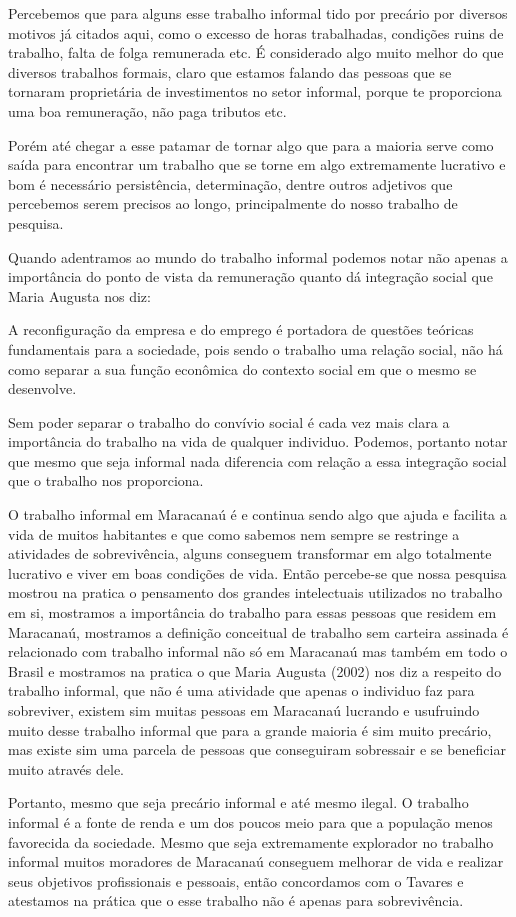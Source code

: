 Percebemos que para alguns esse trabalho informal tido por precário por diversos 
motivos já citados aqui, como o excesso de horas trabalhadas, condições ruins de 
trabalho, falta de folga remunerada etc. É considerado algo muito melhor do que 
diversos trabalhos formais, claro que estamos falando das pessoas que se 
tornaram proprietária de investimentos no setor informal, porque te proporciona 
uma boa remuneração, não paga tributos etc. 

Porém até chegar a esse patamar de 
tornar algo que para a maioria serve como saída para encontrar um trabalho que 
se torne em algo extremamente lucrativo e bom é necessário persistência, 
determinação, dentre outros adjetivos que percebemos serem precisos ao longo, 
principalmente do nosso trabalho de pesquisa. 

Quando adentramos ao mundo do trabalho informal podemos notar não apenas a 
importância do ponto de vista da remuneração quanto dá integração social que 
Maria Augusta nos diz:

\begin{citacao}
A reconfiguração da empresa e do emprego é portadora de questões teóricas 
fundamentais para a sociedade, pois sendo o trabalho uma relação social, não há 
como separar a sua função econômica do contexto social em que o mesmo se 
desenvolve. \cite{augusta}
\end{citacao}

Sem poder separar o trabalho do convívio social é cada vez mais clara a 
importância do trabalho na vida de qualquer individuo. Podemos, portanto notar 
que mesmo que seja informal nada diferencia com relação a essa integração social 
que o trabalho nos proporciona.

O trabalho informal em Maracanaú é e continua sendo algo que ajuda e facilita a 
vida de muitos habitantes e que como sabemos nem sempre se restringe a 
atividades de sobrevivência, alguns conseguem transformar em algo totalmente 
lucrativo e viver em boas condições de vida. Então percebe-se que nossa pesquisa 
mostrou na pratica o pensamento dos grandes intelectuais utilizados no trabalho 
em si, mostramos a importância do trabalho para essas pessoas que residem em 
Maracanaú, mostramos a definição conceitual de trabalho sem carteira assinada é 
relacionado com trabalho informal não só em Maracanaú mas também em todo o 
Brasil e mostramos na pratica o que Maria Augusta (2002)  nos diz a respeito do 
trabalho informal, que não é uma atividade que apenas o individuo faz para 
sobreviver, existem sim muitas pessoas em Maracanaú lucrando e usufruindo muito 
desse trabalho informal que para a grande maioria é sim muito precário, mas 
existe sim uma parcela de pessoas que conseguiram sobressair e se beneficiar 
muito através dele. 

Portanto, mesmo que seja precário informal e até mesmo ilegal. O trabalho 
informal é a fonte de renda e um dos poucos meio para que a população menos 
favorecida da sociedade. Mesmo que seja extremamente explorador no trabalho 
informal muitos moradores de Maracanaú conseguem melhorar de vida e realizar 
seus objetivos profissionais e pessoais, então concordamos com o Tavares e 
atestamos na prática que o esse trabalho não é apenas para sobrevivência. 
